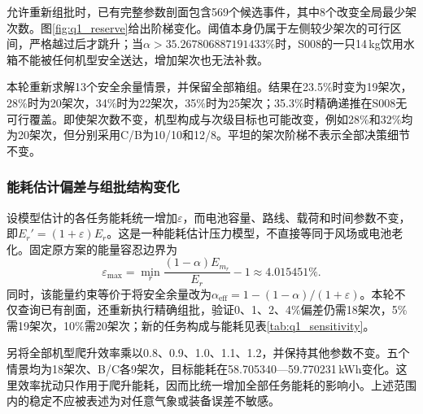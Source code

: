 允许重新组批时，已有完整参数剖面包含569个候选事件，其中8个改变全局最少架次数。图\ref{fig:q1_reserve}给出阶梯变化。阈值本身仍属于左侧较少架次的可行区间，严格越过后才跳升；当$\alpha>35.267806887191433\%$时，S008的一只14\,kg饮用水箱不能被任何机型安全送达，增加架次也无法补救。

本轮重新求解13个安全余量情景，并保留全部箱组。结果在23.5\%时变为19架次，28\%时为20架次，34\%时为22架次，35\%时为25架次；35.3\%时精确递推在S008无可行覆盖。即使架次数不变，机型构成与次级目标也可能改变，例如28\%和32\%均为20架次，但分别采用C/B为10/10和12/8。平坦的架次阶梯不表示全部决策细节不变。

\subsubsection{能耗估计偏差与组批结构变化}
设模型估计的各任务能耗统一增加$\varepsilon$，而电池容量、路线、载荷和时间参数不变，即$E_r'=(1+\varepsilon)E_r$。这是一种能耗估计压力模型，不直接等同于风场或电池老化。固定原方案的能量容忍边界为
\begin{equation}
 \varepsilon_{\max}=\min_r\frac{(1-\alpha)E_{m_r}}{E_r}-1\approx4.015451\%.
\label{eq:q1_energy_limit}
\end{equation}
同时，该能量约束等价于将安全余量改为$\alpha_{\mathrm{eff}}=1-(1-\alpha)/(1+\varepsilon)$。本轮不仅查询已有剖面，还重新执行精确组批，验证0、1、2、4\%偏差仍需18架次，5\%需19架次，10\%需20架次；新的任务构成与能耗见表\ref{tab:q1_sensitivity}。


另将全部机型爬升效率乘以0.8、0.9、1.0、1.1、1.2，并保持其他参数不变。五个情景均为18架次、B/C各9架次，目标能耗在58.705340—59.770231\,kWh变化。这里效率扰动只作用于爬升能耗，因而比统一增加全部任务能耗的影响小。上述范围内的稳定不应被表述为对任意气象或装备误差不敏感。
